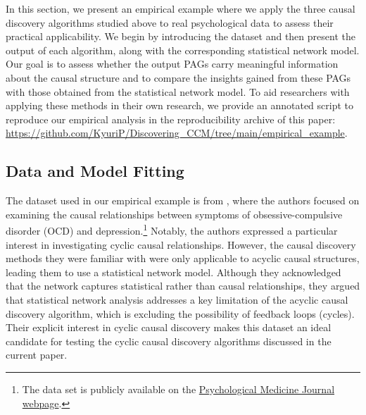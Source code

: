 \documentclass[twoside, 11pt]{article}
\begin{document}
In this section, we present an empirical example where we apply the three causal discovery algorithms studied above to real psychological data to assess their practical applicability. We begin by introducing the dataset and then present the output of each algorithm, along with the corresponding statistical network model. Our goal is to assess whether the output PAGs carry meaningful information about the causal structure and to compare the insights gained from these PAGs with those obtained from the statistical network model. To aid researchers with applying these methods in their own research, we provide an annotated script to reproduce our empirical analysis in the reproducibility archive of this paper: \url{https://github.com/KyuriP/Discovering_CCM/tree/main/empirical_example}.


\subsection{Data and Model Fitting}
The dataset used in our empirical example is from \cite{mcnally_co-morbid_2017}, where the authors focused on examining the causal relationships between symptoms of obsessive-compulsive disorder (OCD) and depression.\footnote{The data set is publicly available on the \href{https://www.cambridge.org/core/journals/psychological-medicine/article/abs/comorbid-obsessivecompulsive-disorder-and-depression-a-bayesian-network-approach/DAA4E2352A9E26809A4EAE35C366E900\#supplementary-materials}{Psychological Medicine Journal webpage}.} Notably, the authors expressed a particular interest in investigating cyclic causal relationships. However, the causal discovery methods they were familiar with were only applicable to acyclic causal structures, leading them to use a statistical network model. Although they acknowledged that the network captures statistical rather than causal relationships, they argued that statistical network analysis addresses a key limitation of the acyclic causal discovery algorithm, which is excluding the possibility of feedback loops (cycles). Their explicit interest in cyclic causal discovery makes this dataset an ideal candidate for testing the cyclic causal discovery algorithms discussed in the current paper.
\end{document}
